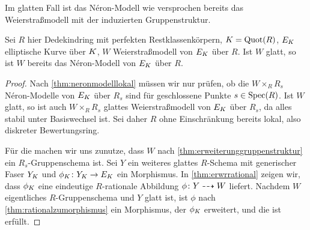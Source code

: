 Im glatten Fall ist das Néron-Modell wie versprochen bereits das
Weierstraßmodell mit der induzierten Gruppenstruktur.
\begin{Korollar}\label{thm:neronmausweierstrassgl}
  Sei $R$ hier Dedekindring mit perfekten Restklassenkörpern, $K=\operatorname{Quot}(R)$,
  $E_{K}$ elliptische Kurve über $K$, $W$ Weierstraßmodell von $E_{K}$
  über $R$.
  Ist $W$ glatt, so ist $W$ bereits das Néron-Modell von $E_{K}$ über
  $R$.
  \begin{proof}
    Nach \ref{thm:neronmodelllokal} müssen wir nur prüfen, ob die 
    $W\times_R R_s$ Néron-Modelle von $E_{K}$ über $R_s$ sind für
    geschlossene Punkte $s\in\operatorname{Spec}(R)$.
    Ist $W$ glatt, so ist auch $W\times_R R_s$ glattes
    Weierstraßmodell von $E_{K}$ über $R_s$, da alles stabil unter
    Basiswechsel ist.
    Sei daher $R$ ohne Einschränkung bereits lokal, also diskreter
    Bewertungsring.
    

    Für die \NAbbEig machen wir uns zunutze, dass $W$ nach
    \ref{thm:erweiterunggruppenstruktur} ein $R_s$-Gruppenschema ist.
    Sei $Y$ ein weiteres glattes $R$-Schema mit generischer Faser
    $Y_{K}$ und $\phi_{K}\colon Y_{K}\to E_{K}$ ein Morphismus.
    In \ref{thm:erwrrational} zeigen wir, dass $\phi_{K}$ eine
    eindeutige $R$-rationale Abbildung $\phi\colon Y\dashrightarrow W$ liefert.
    Nachdem $W$ eigentliches $R$-Gruppenschema und $Y$ glatt ist, ist
    $\phi$ nach \ref{thm:rationalzumorphismus} ein Morphismus, der
    $\phi_{K}$ erweitert, und die \NAbbEig ist erfüllt.
  \end{proof}
\end{Korollar}

